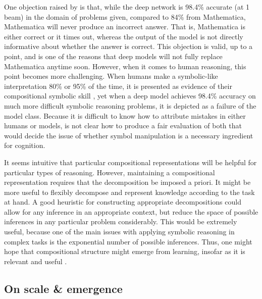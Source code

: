 One objection raised by \citet{Davis2019} is that, while the deep network is 98.4\% accurate (at 1 beam) in the domain of problems given, compared to 84\% from Mathematica, Mathematica will never produce an incorrect answer. That is, Mathematica is either correct or it times out, whereas the output of the model is not directly informative about whether the answer is correct. This objection is valid, up to a point, and is one of the reasons that deep models will not fully replace Mathematica anytime soon. However, when it comes to human reasoning, this point becomes more challenging. When humans make a symbolic-like interpretation 80\% or 95\% of the time, it is presented as evidence of their compositional symbolic skill \citep{Lake2019a}, yet when a deep model achieves 98.4\% accuracy on much more difficult symbolic reasoning problems, it is depicted as a failure of the model class. Because it is difficult to know how to attribute mistakes in either humans or models, is not clear how to produce a fair evaluation of both that would decide the issue of whether symbol manipulation is a necessary ingredient for cognition.\par 
It seems intuitive that particular compositional representations will be helpful for particular types of reasoning. However, maintaining a compositional representation requires that the decomposition be imposed a priori. It might be more useful to flexibly decompose and represent knowledge according to the task at hand. A good heuristic for constructing appropriate decompositions could allow for any inference in an appropriate context, but reduce the space of possible inferences in any particular problem considerably. This would be extremely useful, because one of the main issues with applying symbolic reasoning in complex tasks is the exponential number of possible inferences. Thus, one might hope that compositional structure might emerge from learning, insofar as it is relevant and useful \citep{McClelland2010}.\par 

\subsection{On scale \& emergence}

